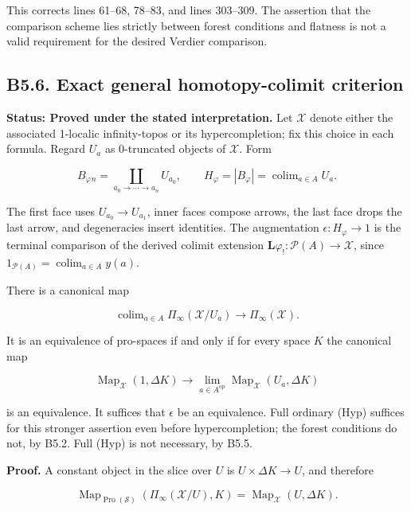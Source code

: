 This corrects  lines
61--68, 78--83, and  lines
303--309. The assertion that the comparison scheme lies strictly between
forest conditions and flatness is not a valid requirement for the
desired Verdier comparison.

\subsection{B5.6. Exact general homotopy-colimit
criterion}\label{b5.6.-exact-general-homotopy-colimit-criterion}

\textbf{Status: Proved under the stated interpretation.} Let
\(\mathscr X\) denote either the associated 1-localic infinity-topos or
its hypercompletion; fix this choice in each formula. Regard \(U_a\) as
0-truncated objects of \(\mathscr X\). Form

\[B_\varphi{}_n=\coprod_{a_0\to\cdots\to a_n}U_{a_0},\qquad
H_\varphi=|B_\varphi|=\operatorname{colim}_{a\in A}U_a.\]

The first face uses \(U_{a_0}\to U_{a_1}\), inner faces compose arrows,
the last face drops the last arrow, and degeneracies insert identities.
The augmentation \(\epsilon:H_\varphi\to1\) is the terminal comparison
of the derived colimit extension
\(\mathbf L\varphi_!:\mathcal P(A)\to\mathscr X\), since
\(1_{\mathcal P(A)}=\operatorname{colim}_{a\in A}y(a)\).

There is a canonical map

\[\operatorname{colim}_{a\in A}\Pi_\infty(\mathscr X/U_a)\longrightarrow\Pi_\infty(\mathscr X).\tag{B5.6.1}\]

It is an equivalence of pro-spaces if and only if for every space \(K\)
the canonical map

\[\operatorname{Map}_{\mathscr X}(1,\Delta K)\longrightarrow
\lim_{a\in A^{\mathrm{op}}}\operatorname{Map}_{\mathscr X}(U_a,\Delta K)\tag{B5.6.2}\]

is an equivalence. It suffices that \(\epsilon\) be an equivalence. Full
ordinary (Hyp) suffices for this stronger assertion even before
hypercompletion; the forest conditions do not, by B5.2. Full (Hyp) is
not necessary, by B5.5.

\textbf{Proof.} A constant object in the slice over \(U\) is
\(U\times\Delta K\to U\), and therefore

\[\operatorname{Map}_{\operatorname{Pro}(\mathcal S)}(\Pi_\infty(\mathscr X/U),K)
=\operatorname{Map}_{\mathscr X}(U,\Delta K).\]

